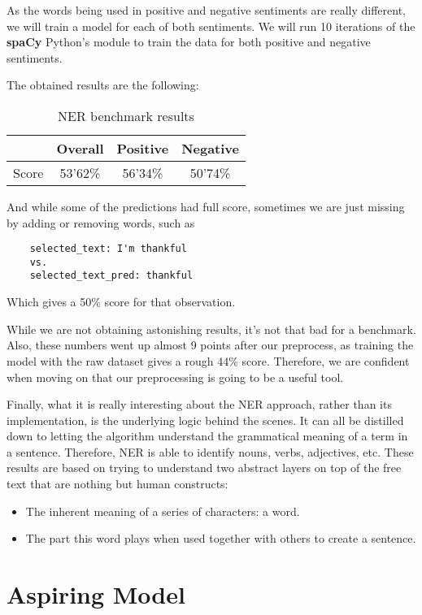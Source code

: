 \documentclass[11pt]{article}
\begin{document}
As the words being used in positive and negative sentiments are really different, we will train a model for each of both sentiments. We will run 10 iterations of the \textbf{spaCy} Python's module to train the data for both positive and negative sentiments.

The obtained results are the following:

\begin{table}[h]
\centering
\begin{tabular}{c|c|c|c}
\hline
\hline
 & Overall & Positive & Negative \\ \hline
Score & 53'62\% & 56'34\% & 50'74\% \\ 
\hline
\hline
\end{tabular}
\caption{NER benchmark results}
\label{tab:bench-results}
\end{table}

And while some of the predictions had full score, sometimes we are just missing by adding or removing words, such as

\begin{verbatim}
    selected_text: I'm thankful
    vs.
    selected_text_pred: thankful
\end{verbatim}

Which gives a 50\% score for that observation.

While we are not obtaining astonishing results, it's not that bad for a benchmark. Also, these numbers went up almost 9 points after our preprocess, as training the model with the raw dataset gives a rough 44\% score. Therefore, we are confident when moving on that our preprocessing is going to be a useful tool.

Finally, what it is really interesting about the NER approach, rather than its implementation, is the underlying logic behind the scenes. It can all be distilled down to letting the algorithm understand the grammatical meaning of a term in a sentence. Therefore, NER is able to identify nouns, verbs, adjectives, etc. These results are based on trying to understand two abstract layers on top of the free text that are nothing but human constructs:
\begin{itemize}
    \item The inherent meaning of a series of characters: a word.
    \item The part this word plays when used together with others to create a sentence.
\end{itemize}


\section{Aspiring Model}
\end{document}
